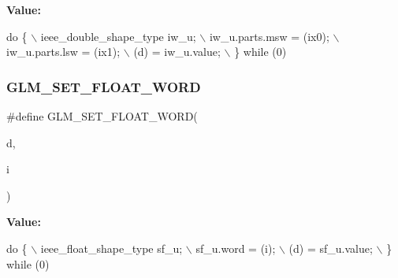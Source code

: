 {\bfseries Value\+:}
\begin{DoxyCode}
\textcolor{keywordflow}{do} \{                                    \(\backslash\)
        ieee\_double\_shape\_type iw\_u;        \(\backslash\)
        iw\_u.parts.msw = (ix0);             \(\backslash\)
        iw\_u.parts.lsw = (ix1);             \(\backslash\)
        (d) = iw\_u.value;                   \(\backslash\)
    \} \textcolor{keywordflow}{while} (0)
\end{DoxyCode}
\mbox{\label{ulp_8inl_ab01ab8df0632f4a5f05e00f570e6b873}} 
\subsubsection{\texorpdfstring{G\+L\+M\+\_\+\+S\+E\+T\+\_\+\+F\+L\+O\+A\+T\+\_\+\+W\+O\+RD}{GLM\_SET\_FLOAT\_WORD}}
{\footnotesize\ttfamily \#define G\+L\+M\+\_\+\+S\+E\+T\+\_\+\+F\+L\+O\+A\+T\+\_\+\+W\+O\+RD(\begin{DoxyParamCaption}\item[{}]{d,  }\item[{}]{i }\end{DoxyParamCaption})}

{\bfseries Value\+:}
\begin{DoxyCode}
\textcolor{keywordflow}{do} \{                                    \(\backslash\)
        ieee\_float\_shape\_type sf\_u;         \(\backslash\)
        sf\_u.word = (i);                    \(\backslash\)
        (d) = sf\_u.value;                   \(\backslash\)
    \} \textcolor{keywordflow}{while} (0)
\end{DoxyCode}
